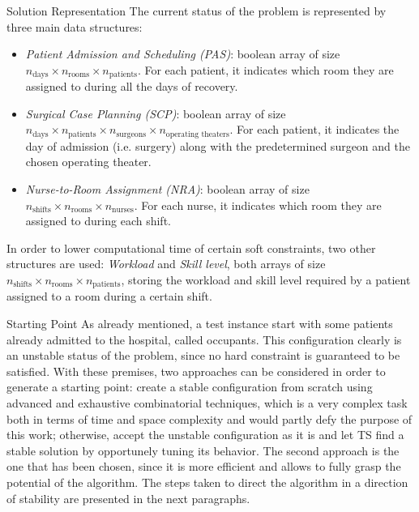 \begin{section}
 \begin{subsection}
     {Solution Representation}
     The current status of the problem is represented by
     three main data structures:
     \begin{itemize}
         \item \textit{Patient Admission and Scheduling (PAS)}:
               boolean array of size $n_{\text{days}} \times n_{\text{rooms}} \times n_{\text{patients}}$.
               For each patient, it indicates which room they are assigned to during all the days of recovery.
         \item \textit{Surgical Case Planning (SCP)}:
               boolean array of size $n_{\text{days}} \times n_{\text{patients}} \times n_{\text{surgeons}} \times n_{\text{operating theaters}}$.
               For each patient, it indicates the day of admission (i.e. surgery) along with the predetermined surgeon and the chosen operating theater.
         \item \textit{Nurse-to-Room Assignment (NRA)}:
               boolean array of size $n_{\text{shifts}} \times n_{\text{rooms}} \times n_{\text{nurses}}$.
               For each nurse, it indicates which room they are assigned to during each shift.
     \end{itemize}
     In order to lower computational time of certain soft constraints, two other structures are used:
     \textit{Workload} and \textit{Skill level}, both arrays of size $n_{\text{shifts}} \times n_{\text{rooms}} \times n_{\text{patients}}$,
     storing the workload and skill level required by a patient assigned to a room during a certain shift.
 \end{subsection}

 \begin{subsection}
     {Starting Point}
     As already mentioned, a test instance start with some patients already admitted to the hospital, called occupants.
     This configuration clearly is an unstable status of the problem, since no hard constraint is guaranteed to be satisfied.
     With these premises, two approaches can be considered in order to generate a starting point: create a stable configuration from scratch
     using advanced and exhaustive combinatorial techniques, which is a very complex task both
     in terms of time and space complexity and would partly defy the purpose of this work;
     otherwise, accept the unstable configuration as it is and let TS
     find a stable solution by opportunely tuning its behavior.
     The second approach is the one that has been chosen, since it is more efficient and allows to fully grasp
     the potential of the algorithm. The steps taken to direct the algorithm in a direction of stability are presented
     in the next paragraphs.


\end{subsection}
\end{section}

